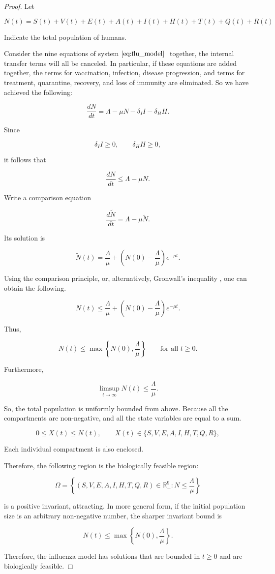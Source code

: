 \documentclass[12pt,a4paper]{article}
\theoremstyle{definition}
\theoremstyle{remark}
\begin{document}
\begin{proof}

Let

$$
N(t)=S(t)+V(t)+E(t)+A(t)+I(t)+H(t)+T(t)+Q(t)+R(t)
$$

Indicate the total population of humans.


Consider the nine equations of system$~\eqref{eq:flu_model}~$ together, the internal transfer terms will all be canceled. In particular, if these equations are added together, the terms for vaccination, infection, disease progression, and terms for treatment, quarantine, recovery, and loss of immunity are eliminated. So we have achieved the following:



$$
\frac{dN}{dt}
=
\Lambda
-
\mu N
-
\delta_I I
-
\delta_H H.
$$

Since

$$
\delta_I I\geq0,
\qquad
\delta_H H\geq0,
$$

it follows that

$$
\frac{dN}{dt}
\leq
\Lambda-\mu N.
$$

Write a comparison equation

$$
\frac{d\widetilde N}{dt}
=
\Lambda-\mu\widetilde N.
$$

Its solution is

$$
\widetilde N(t)
=
\frac{\Lambda}{\mu}
+
\left(
N(0)-\frac{\Lambda}{\mu}
\right)e^{-\mu t}.
$$

Using the comparison principle, or, alternatively, Gronwall's inequality \cite{hartman2002ode}, one can obtain the following. 

$$
N(t)
\leq
\frac{\Lambda}{\mu}
+
\left(
N(0)-\frac{\Lambda}{\mu}
\right)e^{-\mu t}.
$$

Thus,

$$
N(t)
\leq
\max\left\{
N(0),\frac{\Lambda}{\mu}
\right\}
\qquad\text{for all }t\geq0.
$$

Furthermore,

$$
\limsup_{t\to\infty}N(t)
\leq
\frac{\Lambda}{\mu}.
$$

So, the total population is uniformly bounded from above. Because all the compartments are non-negative, and all the state variables are equal to a sum.

$$
0\leq X(t)\leq N(t),
\qquad
X(t)\in\{S,V,E,A,I,H,T,Q,R\},
$$

Each individual compartment is also enclosed.

Therefore, the following region is the biologically feasible region:

$$
\Omega
=
\left\{
(S,V,E,A,I,H,T,Q,R)\in\mathbb{R}_+^9:
N\leq\frac{\Lambda}{\mu}
\right\}
$$

is a positive invariant, attracting. In more general form, if the initial population size is an arbitrary non-negative number, the sharper invariant bound is

$$
N(t)\leq
\max\left\{
N(0),\frac{\Lambda}{\mu}
\right\}.
$$

Therefore, the influenza model has solutions that are bounded in $t\geq0$ and are biologically feasible.

\end{proof}
\end{document}
